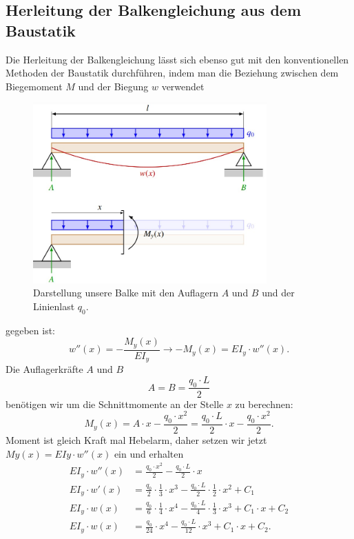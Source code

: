 \subsection{Herleitung der Balkengleichung aus dem Baustatik}
Die Herleitung der Balkengleichung lässt sich ebenso gut mit den konventionellen Methoden der Baustatik durchführen, indem man die Beziehung zwischen dem Biegemoment $M$ und der Biegung $w$ verwendet
\begin{figure}
\begin{center}
	\includegraphics[width=0.8\textwidth]{papers/balken/images/teil2/HerleitungBaustatik.jpg}
\end{center}
\caption{Darstellung unsere Balke mit den Auflagern $A$ und $B$ und der Linienlast $q_0$.}
\end{figure}
gegeben ist:
\begin{equation}
	w''(x)=
	-\frac{M_y(x)}{EI_y}
	\rightarrow-M_y(x)=
	EI_y\cdot w''(x).
\end{equation}
Die Auflagerkräfte $A$ und $B$
\begin{equation}
	A=
	B=
	\frac{q_0\cdot L}{2}
\end{equation}
benötigen wir um die Schnittmomente an der Stelle $x$ zu berechnen:
\begin{equation}
	M_y(x)=
	A\cdot x-\frac{q_0\cdot x^2}{2}=
	\frac{q_0\cdot L}{2}\cdot x-\frac{q_0\cdot x^2}{2}.
\end{equation}
Moment ist gleich Kraft mal Hebelarm, daher setzen wir jetzt $My(x) = EIy \cdot w''(x)$ ein und erhalten
\begin{align}
		EI_y\cdot w''(x)&=
		\frac{q_0\cdot x^2}{2}-\frac{q_0\cdot L}{2}\cdot x
	\\
		EI_y\cdot w'\left(x\right)&=
		\frac{q_0}{2}\cdot\frac{1}{3}\cdot x^3-\frac{q_0\cdot 	L}{2}\cdot\frac{1}{2}\cdot x^2+C_1
	\\
		EI_y\cdot w\left(x\right)&=
		\frac{q_0}{6}\cdot\frac{1}{4}\cdot x^4-\frac{q_0\cdot 	L}{4}\cdot\frac{1}{3}\cdot x^3+C_1\cdot x+C_2
	\\
		EI_y\cdot w\left(x\right)&=
		\frac{q_0}{24}\cdot x^4-\frac{q_0\cdot L}{12}\cdot x^3+C_1\cdot x+C_2.
\end{align}

